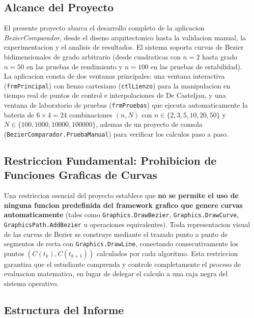 \subsection{Alcance del Proyecto}
\label{subsec:intro_alcance}

El presente proyecto abarca el desarrollo completo de la aplicacion \textit{BezierComparador}, desde el diseno arquitectonico hasta la validacion manual, la experimentacion y el analisis de resultados. El sistema soporta curvas de Bezier bidimensionales de grado arbitrario (desde cuadraticas con $n = 2$ hasta grado $n = 50$ en las pruebas de rendimiento y $n = 100$ en las pruebas de estabilidad). La aplicacion consta de dos ventanas principales: una ventana interactiva (\texttt{frmPrincipal}) con lienzo cartesiano (\texttt{ctlLienzo}) para la manipulacion en tiempo real de puntos de control e interpolaciones de De Casteljau, y una ventana de laboratorio de pruebas (\texttt{frmPruebas}) que ejecuta automaticamente la bateria de $6 \times 4 = 24$ combinaciones $(n, N)$ con $n \in \{2, 3, 5, 10, 20, 50\}$ y $N \in \{100, 1000, 10000, 100000\}$, ademas de un proyecto de consola (\texttt{BezierComparador.PruebaManual}) para verificar los calculos paso a paso.

\subsection{Restriccion Fundamental: Prohibicion de Funciones Graficas de Curvas}
\label{subsec:intro_restriccion}

Una restriccion esencial del proyecto establece que \textbf{no se permite el uso de ninguna funcion predefinida del framework grafico que genere curvas automaticamente} (tales como \texttt{Graphics.DrawBezier}, \texttt{Graphics.DrawCurve}, \texttt{GraphicsPath.AddBezier} u operaciones equivalentes). Toda representacion visual de las curvas de Bezier se construye mediante el trazado punto a punto de segmentos de recta con \texttt{Graphics.DrawLine}, conectando consecutivamente los puntos $(C(t_k), C(t_{k+1}))$ calculados por cada algoritmo. Esta restriccion garantiza que el estudiante comprenda y controle completamente el proceso de evaluacion matematica, en lugar de delegar el calculo a una caja negra del sistema operativo.

\subsection{Estructura del Informe}
\label{subsec:intro_estructura}

